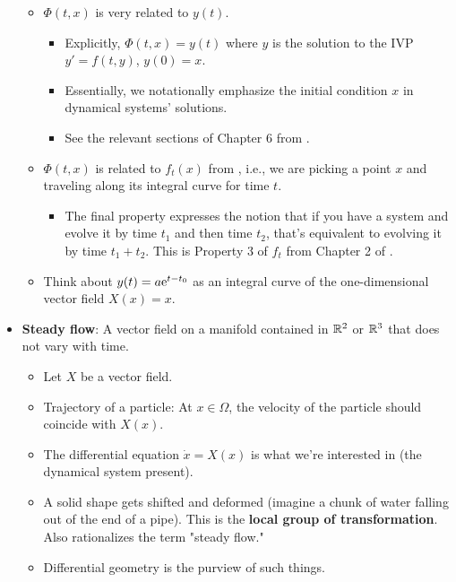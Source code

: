 \documentclass[../notes.tex]{subfiles}
\begin{document}
\begin{itemize}
\begin{equation*}
    \end{equation*}
    \begin{itemize}
        \item $\Phi(t,x)$ is very related to $y(t)$.
        \begin{itemize}
            \item Explicitly, $\Phi(t,x)=y(t)$ where $y$ is the solution to the IVP $y'=f(t,y)$, $y(0)=x$.
            \item Essentially, we notationally emphasize the initial condition $x$ in dynamical systems' solutions.
            \item See the relevant sections of Chapter 6 from \textcite{bib:Teschl}.
        \end{itemize}
        \item $\Phi(t,x)$ is related to $f_t(x)$ from \textcite{bib:DifferentialForms}, i.e., we are picking a point $x$ and traveling along its integral curve for time $t$.
        \begin{itemize}
            \item The final property expresses the notion that if you have a system and evolve it by time $t_1$ and then time $t_2$, that's equivalent to evolving it by time $t_1+t_2$. This is Property 3 of $f_t$ from Chapter 2 of \textcite{bib:DifferentialForms}.
        \end{itemize}
        \item Think about $y(t)=a\e[t-t_0]$ as an integral curve of the one-dimensional vector field $X(x)=x$.
    \end{itemize}
    \item \textbf{Steady flow}: A vector field on a manifold contained in $\R^2$ or $\R^3$ that does not vary with time.
    \begin{itemize}
        \item Let $X$ be a vector field.
        \item Trajectory of a particle: At $x\in\Omega$, the velocity of the particle should coincide with $X(x)$.
        \item The differential equation $\dot{x}=X(x)$ is what we're interested in (the dynamical system present).
        \item A solid shape gets shifted and deformed (imagine a chunk of water falling out of the end of a pipe). This is the \textbf{local group of transformation}. Also rationalizes the term "steady flow."
        \item Differential geometry is the purview of such things.

\end{itemize}
\end{itemize}
\end{document}
